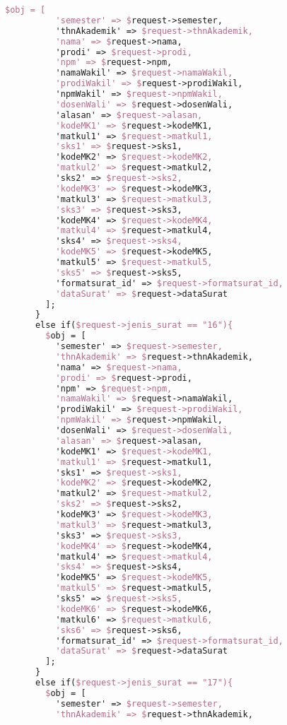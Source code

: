 \begin{lstlisting}[language=tex,basicstyle=\tiny,caption=PesanansuratController.php]
        $obj = [
          'semester' => $request->semester,
          'thnAkademik' => $request->thnAkademik,
          'nama' => $request->nama,
          'prodi' => $request->prodi,
          'npm' => $request->npm,
          'namaWakil' => $request->namaWakil,
          'prodiWakil' => $request->prodiWakil,
          'npmWakil' => $request->npmWakil,
          'dosenWali' => $request->dosenWali,
          'alasan' => $request->alasan,
          'kodeMK1' => $request->kodeMK1,
          'matkul1' => $request->matkul1,
          'sks1' => $request->sks1,
          'kodeMK2' => $request->kodeMK2,
          'matkul2' => $request->matkul2,
          'sks2' => $request->sks2,
          'kodeMK3' => $request->kodeMK3,
          'matkul3' => $request->matkul3,
          'sks3' => $request->sks3,
          'kodeMK4' => $request->kodeMK4,
          'matkul4' => $request->matkul4,
          'sks4' => $request->sks4,
          'kodeMK5' => $request->kodeMK5,
          'matkul5' => $request->matkul5,
          'sks5' => $request->sks5,
          'formatsurat_id' => $request->formatsurat_id,
          'dataSurat' => $request->dataSurat
        ];
      }
      else if($request->jenis_surat == "16"){
        $obj = [
          'semester' => $request->semester,
          'thnAkademik' => $request->thnAkademik,
          'nama' => $request->nama,
          'prodi' => $request->prodi,
          'npm' => $request->npm,
          'namaWakil' => $request->namaWakil,
          'prodiWakil' => $request->prodiWakil,
          'npmWakil' => $request->npmWakil,
          'dosenWali' => $request->dosenWali,
          'alasan' => $request->alasan,
          'kodeMK1' => $request->kodeMK1,
          'matkul1' => $request->matkul1,
          'sks1' => $request->sks1,
          'kodeMK2' => $request->kodeMK2,
          'matkul2' => $request->matkul2,
          'sks2' => $request->sks2,
          'kodeMK3' => $request->kodeMK3,
          'matkul3' => $request->matkul3,
          'sks3' => $request->sks3,
          'kodeMK4' => $request->kodeMK4,
          'matkul4' => $request->matkul4,
          'sks4' => $request->sks4,
          'kodeMK5' => $request->kodeMK5,
          'matkul5' => $request->matkul5,
          'sks5' => $request->sks5,
          'kodeMK6' => $request->kodeMK6,
          'matkul6' => $request->matkul6,
          'sks6' => $request->sks6,
          'formatsurat_id' => $request->formatsurat_id,
          'dataSurat' => $request->dataSurat
        ];
      }
      else if($request->jenis_surat == "17"){
        $obj = [
          'semester' => $request->semester,
          'thnAkademik' => $request->thnAkademik,

\end{lstlisting}
